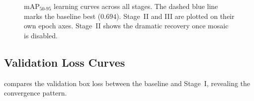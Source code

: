 \documentclass[11pt, a4paper]{article}
\newcommand{\mapfull}{\text{mAP}_{50\text{-}95}}
\begin{document}
\begin{figure}[H]
  \caption{$\mapfull$ learning curves across all stages.  The dashed
    blue line marks the baseline best ($0.694$).  Stage~II and III are
    plotted on their own epoch axes.  Stage~II shows the dramatic recovery
    once mosaic is disabled.}
  \label{fig:map_curves}
\end{figure}

\subsection{Validation Loss Curves}

 compares the validation box loss between the
baseline and Stage~I, revealing the convergence pattern.
\end{document}

